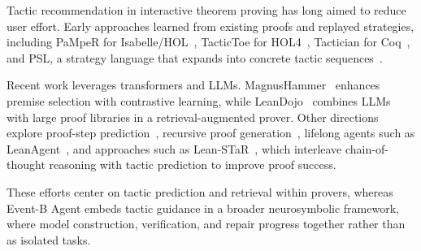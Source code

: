Tactic recommendation in interactive theorem proving has long aimed to reduce user effort. Early approaches learned from existing proofs and replayed strategies, including PaMpeR for Isabelle/HOL~\cite{nagashima2018pamper}, TacticToe for HOL4~\cite{gauthier2021tactictoe}, Tactician for Coq~\cite{blaauwbroek2020tactician}, and PSL, a strategy language that expands into concrete tactic sequences~\cite{nagashima2017proof}.

Recent work leverages transformers and LLMs. MagnusHammer~\cite{mikula2023magnushammer} enhances premise selection with contrastive learning, while LeanDojo~\cite{yang2023leandojo} combines LLMs with large proof libraries in a retrieval-augmented prover. Other directions explore proof-step prediction~\cite{gloeckle2023temperature}, recursive proof generation~\cite{wang2024proving}, lifelong agents such as LeanAgent~\cite{kumarappan2024leanagent}, and approaches such as Lean-STaR~\cite{lin2024lean}, which interleave chain-of-thought reasoning with tactic prediction to improve proof success.

These efforts center on tactic prediction and retrieval within provers, whereas Event-B Agent embeds tactic guidance in a broader neurosymbolic framework, where model construction, verification, and repair progress together rather than as isolated tasks.


